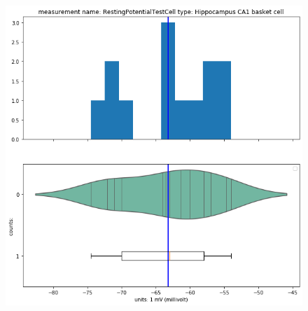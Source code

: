 \begin{figure}
  \centering
  \includegraphics[scale=0.45]{notebooks_converted/needata_thesis_files/needata_thesis_5_6}
    
  \label{fig:sub2}
\end{figure}

    
    

